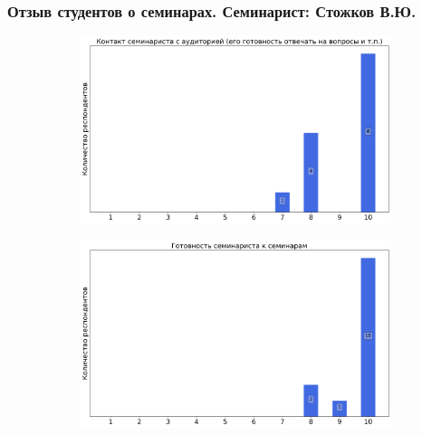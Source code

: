         \subsubsection{Отзыв студентов о семинарах. Семинарист: Стожков В.Ю.}
            \begin{figure}[H]
                \centering
                \begin{subfigure}[b]{0.45\textwidth}
                    \centering
                    \includegraphics[width=\textwidth]{images/3 course/Общая физика - квантовая физика/seminarists-marks-Стожков В.Ю.-0.png}
                \end{subfigure}
                \begin{subfigure}[b]{0.45\textwidth}
                    \centering
                    \includegraphics[width=\textwidth]{images/3 course/Общая физика - квантовая физика/seminarists-marks-Стожков В.Ю.-1.png}
                \end{subfigure}
                \begin{subfigure}[b]{0.45\textwidth}

\end{subfigure}
\end{figure}
